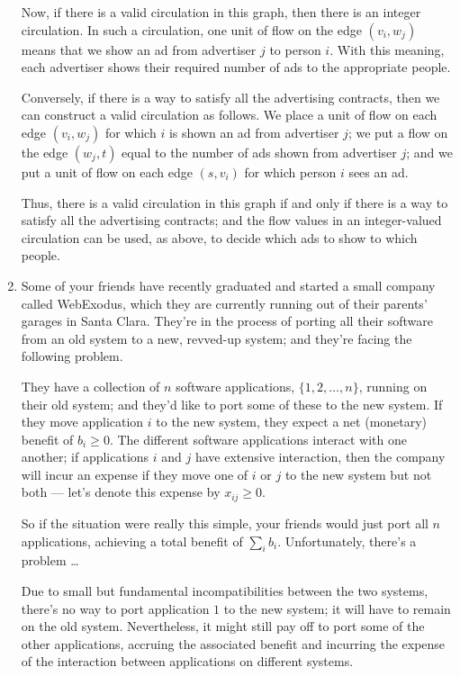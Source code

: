 \documentclass[12pt]{article}
\begin{document}
\begin{enumerate}
{Now, if there is a valid circulation in this graph, then
there is an integer circulation.
In such a circulation, one unit of flow on the edge
$(v_i, w_j)$ means that we show an ad from advertiser $j$ to person $i$.
With this meaning, each advertiser shows their required
number of ads to the appropriate people.

Conversely, if there is a way to satisfy all the advertising
contracts, then we can construct a valid circulation as follows.
We place a unit of flow on each edge $(v_i, w_j)$
for which $i$ is shown an ad from advertiser $j$;
we put a flow on the edge $(w_j, t)$ equal to
the number of ads shown from advertiser $j$;
and we put a unit of flow on each edge $(s,v_i)$
for which person $i$ sees an ad.

Thus, there is a valid circulation in this graph if
and only if there is a way to satisfy all the advertising
contracts; and the flow values in an integer-valued
circulation can be used, as above, to decide which
ads to show to which people.

}



\item

Some of your friends have recently graduated
and started a small company called WebExodus, which they
are currently running out of their parents' garages in Santa Clara.
They're in the process of porting all
their software from an old system to a new, revved-up system;
and they're facing the following problem.

They have a collection of $n$ software applications,
$\{1, 2, \ldots, n\}$, running on their old system;
and they'd like to port some of these to the new system.
If they move application $i$ to the new system, they expect a
net (monetary) benefit of $b_i \geq 0$.
The different software applications interact with one another;
if applications
$i$ and $j$ have extensive interaction, then the company will incur
an expense if they move one of $i$ or $j$ to the new system but not both ---
let's denote this expense by $x_{ij} \geq 0$.

So if the situation were really this simple, your friends would
just port all $n$ applications,
achieving a total benefit of $\sum_i b_i$.
Unfortunately, there's a problem \ldots\

Due to small but fundamental incompatibilities between the two systems,
there's no way to port application $1$ to the new system;
it will have to remain on the old system.
Nevertheless, it might still pay off to port some of the
other applications, accruing the associated benefit and
incurring the expense of the interaction between applications
on different systems.


\end{enumerate}
\end{document}
